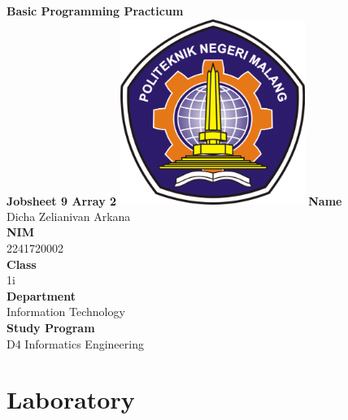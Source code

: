 \documentclass[12pt,titlepage]{article}
\newcommand{\vSubject}{Basic Programming Practicum}
\newcommand{\vSubtitle}{Jobsheet 9 Array 2}
\newcommand{\vName}{Dicha Zelianivan Arkana}
\newcommand{\vNIM}{2241720002}
\newcommand{\vClass}{1i}
\newcommand{\vDepartment}{Information Technology}
\newcommand{\vStudyProgram}{D4 Informatics Engineering}
\begin{document}
\begin{titlepage}
    \centering
    \vfill
    {\bfseries\LARGE
        \vSubject\\
        \vskip0.25cm
        \vSubtitle
    }
    \vfill
    \includegraphics[width=6cm]{images/polinema-logo.png}
    \vfill
    {
        \textbf{Name}\\
        \vName\\
        \vskip0.5cm
        \textbf{NIM}\\
        \vNIM\\
        \vskip0.5cm
        \textbf{Class}\\
        \vClass\\
        \vskip0.5cm
        \textbf{Department}\\
        \vDepartment\\
        \vskip0.5cm
        \textbf{Study Program}\\
        \vStudyProgram
    }
\end{titlepage}

\section{Laboratory}
\end{document}
